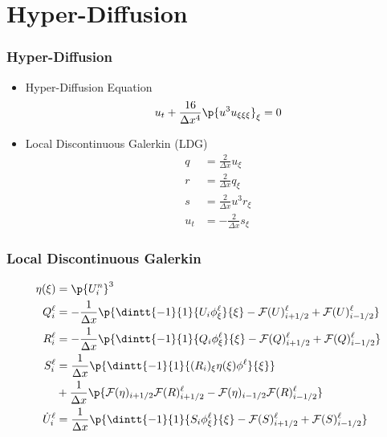 \documentclass[10pt]{beamer}
\begin{document}
  \section{Hyper-Diffusion}
    \begin{frame}
      \frametitle{Hyper-Diffusion}
      \begin{itemize}
        \item Hyper-Diffusion Equation
          \[
            u_t + \frac{16}{\Delta x^4} \p{u^3 u_{\xi\xi\xi}}_\xi = 0
          \]

        \item Local Discontinuous Galerkin (LDG)
          \begin{align*}
            q &= \frac{2}{\Delta x} u_{\xi} \\
            r &= \frac{2}{\Delta x} q_{\xi} \\
            s &= \frac{2}{\Delta x} u^3 r_{\xi} \\
            u_t &= -\frac{2}{\Delta x} s_{\xi}
          \end{align*}
      \end{itemize}
    \end{frame}

    \begin{frame}
      \frametitle{Local Discontinuous Galerkin}
      \begin{align*}
        \eta(\xi) &= \p{U_i^{n}}^3 \\
        Q_i^{\ell} &= -\frac{1}{\Delta x} \p{\dintt{-1}{1}{U_i \phi_{\xi}^{\ell}}{\xi}
        - \mcF(U)_{i+1/2}^{\ell} + \mcF(U)_{i - 1/2}^{\ell}} \\
        R_i^{\ell} &= -\frac{1}{\Delta x} \p{\dintt{-1}{1}{Q_i \phi_{\xi}^{\ell}}{\xi}
        - \mcF(Q)_{i+1/2}^{\ell} + \mcF(Q)_{i - 1/2}^{\ell}} \\
        S_i^{\ell} &= \frac{1}{\Delta x} \p{\dintt{-1}{1}{(R_i)_{\xi} \eta(\xi) \phi^{\ell}}{\xi}} \\
        &+ \frac{1}{\Delta x}\p{\mcF(\eta)_{i + 1/2} \mcF(R)_{i+1/2}^{\ell} - \mcF(\eta)_{i-1/2} \mcF(R)_{i-1/2}^{\ell}}\\
        \dot{U}_i^{\ell} &= \frac{1}{\Delta x} \p{\dintt{-1}{1}{S_i \phi_{\xi}^{\ell}}{\xi}
        - \mcF(S)_{i+1/2}^{\ell} + \mcF(S)_{i - 1/2}^{\ell}}
      \end{align*}
    \end{frame}
\end{document}
